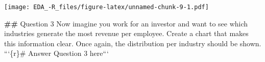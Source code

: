 \documentclass[
]{article}
\begin{document}
\texttt{[image: EDA\_-R\_files/figure-latex/unnamed-chunk-9-1.pdf]}

\textbf{\#\#} Question 3 Now imagine you work for an investor and want
to see which industries generate the most revenue per employee. Create a
chart that makes this information clear. Once again, the distribution
per industry should be shown. ```\{r\}\# Answer Question 3 here```
\end{document}

